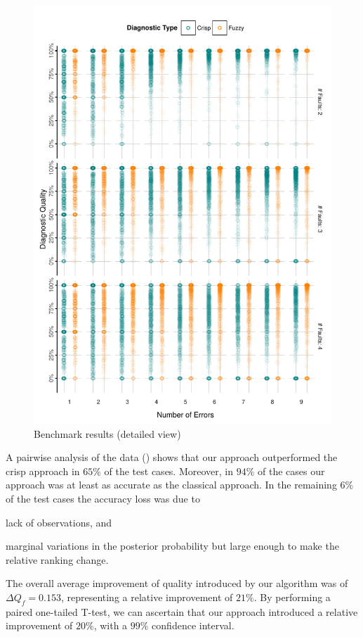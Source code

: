 \begin{figure}[!ht]
  \includegraphics[width=\columnwidth]{figures/fuzzinel/figures/plot4.pdf}
  \caption{Benchmark results (detailed view)
    \label{fig:fuzzinel:res4}}
\end{figure}
\FloatBarrier


A pairwise analysis of the data () shows that
our approach outperformed the crisp approach in $65\%$ of the test
cases.
%
Moreover, in $94\%$ of the cases our approach was at least as accurate
as the classical approach.
%
In the remaining $6\%$ of the test cases the accuracy loss was due to
\begin{inparaenum}[(1)]
\item lack of observations, and
\item marginal variations in the posterior probability but large
  enough to make the relative ranking change.
\end{inparaenum}
%
The overall average improvement of quality introduced by our algorithm
was of $\Delta Q_f = 0.153$, representing a relative improvement of $21\%$.
%
By performing a paired one-tailed T-test, we can ascertain that our
approach introduced a relative improvement of $20\%$, with a $99\%$
confidence interval.

